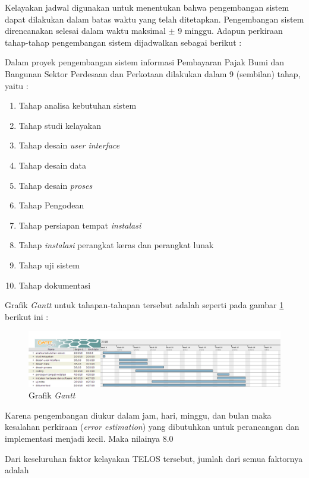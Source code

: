\documentclass[pdftex,12pt, oneside]{article}
\begin{document}
\begin{enumerate}
Kelayakan jadwal digunakan untuk menentukan bahwa pengembangan sistem dapat dilakukan dalam batas waktu yang telah ditetapkan. Pengembangan sistem direncanakan selesai dalam waktu maksimal $\pm$ 9 minggu. Adapun perkiraan tahap-tahap pengembangan sistem dijadwalkan sebagai berikut :

Dalam proyek pengembangan sistem informasi Pembayaran Pajak Bumi dan Bangunan Sektor Perdesaan dan Perkotaan dilakukan dalam 9 (sembilan) tahap, yaitu :

\begin{enumerate}
	\item Tahap analisa kebutuhan sistem 
	\item Tahap studi kelayakan
	\item Tahap desain \textit{user interface}
	\item Tahap desain data
	\item Tahap desain \textit{proses}
	\item Tahap Pengodean
	\item Tahap persiapan tempat \textit{instalasi}
	\item Tahap \textit{instalasi} perangkat keras dan perangkat lunak
	\item Tahap uji sistem
	\item Tahap dokumentasi
\end{enumerate}

Grafik \textit{Gantt} untuk tahapan-tahapan tersebut adalah seperti pada gambar \ref{fig:002-gantt-chart} berikut ini :

\begin{figure}[H]
	\centering
	\includegraphics[width=1\textwidth]{./resources/gantt-chart}
	\caption{Grafik \textit{Gantt}}
	\label{fig:002-gantt-chart}
\end{figure}

Karena pengembangan diukur dalam jam, hari, minggu, dan bulan maka kesalahan perkiraan (\textit{error estimation}) yang dibutuhkan untuk perancangan dan implementasi menjadi kecil. Maka nilainya 8.0
	
\end{enumerate}

Dari keseluruhan faktor kelayakan TELOS tersebut, jumlah dari semua faktornya adalah 
\end{document}

